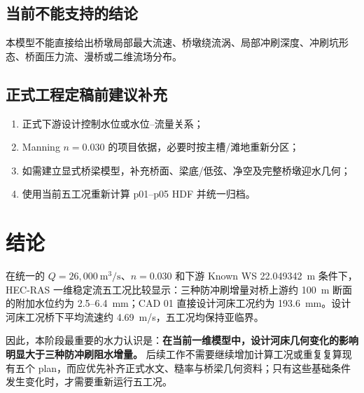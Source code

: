 \documentclass[UTF8,a4paper,12pt]{ctexart}
\newcommand{\mthreeps}{\mathrm{m^3/s}}
\begin{document}
\subsection{当前不能支持的结论}
本模型不能直接给出桥墩局部最大流速、桥墩绕流涡、局部冲刷深度、冲刷坑形态、桥面压力流、漫桥或二维流场分布。

\subsection{正式工程定稿前建议补充}
\begin{enumerate}[leftmargin=2.2em]
\item 正式下游设计控制水位或水位--流量关系；
\item Manning $n=0.030$ 的项目依据，必要时按主槽/滩地重新分区；
\item 如需建立显式桥梁模型，补充桥面、梁底/低弦、净空及完整桥墩迎水几何；
\item 使用当前五工况重新计算 p01--p05 HDF 并统一归档。
\end{enumerate}

\section{结论}
在统一的 $Q=26{,}000\ \mthreeps$、$n=0.030$ 和下游 Known WS 22.049342~m 条件下，HEC-RAS 一维稳定流五工况比较显示：三种防冲刷增量对桥上游约 100~m 断面的附加水位约为 2.5--6.4~mm；CAD 01 直接设计河床工况约为 193.6~mm。设计河床工况桥下平均流速约 4.69~m/s，五工况均保持亚临界。

因此，本阶段最重要的水力认识是：\textbf{在当前一维模型中，设计河床几何变化的影响明显大于三种防冲刷阻水增量。} 后续工作不需要继续增加计算工况或重复复算现有五个 plan，而应优先补齐正式水文、糙率与桥梁几何资料；只有这些基础条件发生变化时，才需要重新运行五工况。
\end{document}
